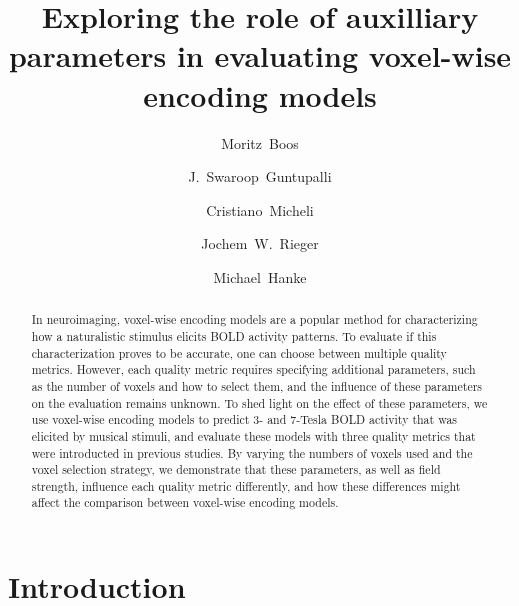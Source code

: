 
\newcommand{\beginsupplement}{%
        \setcounter{table}{0}
        \renewcommand{\thetable}{S\arabic{table}}%
        \setcounter{figure}{0}
        \renewcommand{\thefigure}{S\arabic{figure}}%
     }




\title{Exploring the role of auxilliary parameters in evaluating voxel-wise encoding models}


\author[1]{Moritz~Boos}
\author[2]{J.~Swaroop~Guntupalli}
\author[1]{Cristiano~Micheli}
\author[1]{Jochem~W.~Rieger}
\author[3,4]{Michael~Hanke}

\maketitle

\listoftodos

\begin{abstract}
In neuroimaging, voxel-wise encoding models are a popular method for
characterizing how a naturalistic stimulus elicits BOLD activity patterns.
To evaluate if this characterization proves to be accurate, one can choose
between multiple quality metrics.
However, each quality metric requires specifying additional parameters, such as
the number of voxels and how to select them, and the influence of these
parameters on the evaluation remains unknown.
To shed light on the effect of these parameters, we use voxel-wise encoding models
to predict 3- and 7-Tesla BOLD activity that was elicited by musical stimuli,
and evaluate these models with three quality metrics that were introducted in previous studies.
By varying the numbers of voxels used and the voxel selection strategy, we
demonstrate that these parameters, as well as field strength, influence each quality metric
differently, and how these differences might affect the comparison between
    voxel-wise encoding models.
\end{abstract}

\clearpage


\section*{Introduction}

